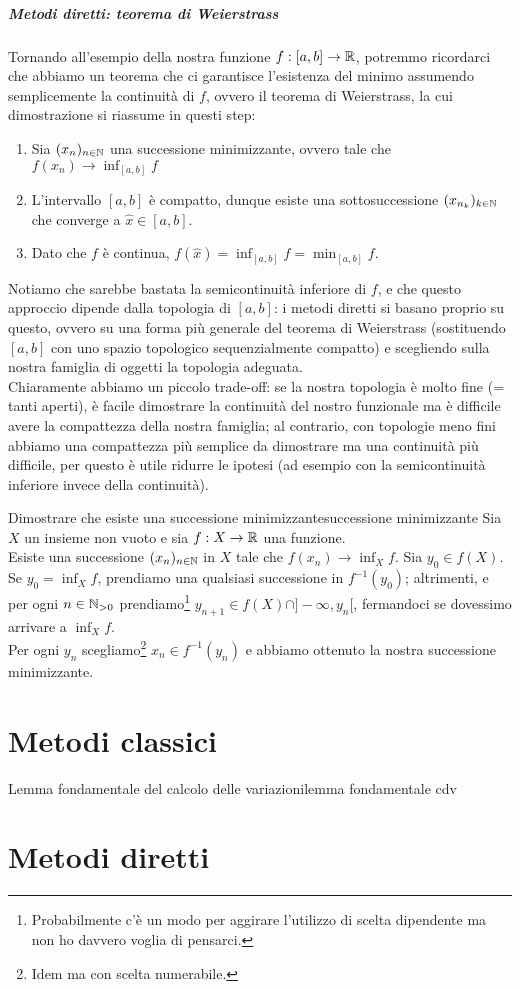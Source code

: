 \documentclass[openany]{book}
\begin{document}
\subsubsection*{Metodi diretti: teorema di Weierstrass}

Tornando all'esempio della nostra funzione $f:[a,b]\to \mathbb{R}$, potremmo ricordarci che abbiamo un teorema che ci garantisce l'esistenza del minimo assumendo semplicemente la continuità di $f$, ovvero il teorema di Weierstrass, la cui dimostrazione si riassume in questi step:\begin{enumerate}
    \item Sia $(x_n)_{n\in\mathbb{N}}$ una successione minimizzante, ovvero tale che $f(x_n)\to \inf_{[a,b]}f$
    \item L'intervallo $[a,b]$ è compatto, dunque esiste una sottosuccessione $(x_{n_k})_{k \in \mathbb{N}}$ che converge a $\hat{x} \in [a,b]$.
    \item Dato che $f$ è continua, $f(\hat{x}) = \inf_{[a,b]}f = \min_{[a,b]}f$.
\end{enumerate}
Notiamo che sarebbe bastata la semicontinuità inferiore di $f$, e che questo approccio dipende dalla topologia di $[a,b]$: i metodi diretti si basano proprio su questo, ovvero su una forma più generale del teorema di Weierstrass (sostituendo $[a,b]$ con uno spazio topologico sequenzialmente compatto) e scegliendo sulla nostra famiglia di oggetti la topologia adeguata.\\
Chiaramente abbiamo un piccolo trade-off: se la nostra topologia è molto fine (= tanti aperti), è facile dimostrare la continuità del nostro funzionale ma è difficile avere la compattezza della nostra famiglia; al contrario, con topologie meno fini abbiamo una compattezza più semplice da dimostrare ma una continuità più difficile, per questo è utile ridurre le ipotesi (ad esempio con la semicontinuità inferiore invece della continuità).

\begin{exercise}{Dimostrare che esiste una successione minimizzante}{successione minimizzante}
    Sia $X$ un insieme non vuoto e sia $f : X\to \mathbb{R}$ una funzione.\\
    Esiste una successione $(x_n)_{n \in \mathbb{N}}$ in $X$ tale che $f(x_n)\to \inf_{X} f$.
    \proof 
    Sia $y_0 \in f(X)$. Se $y_0 = \inf_X f$, prendiamo una qualsiasi successione in $f^{-1}(y_0)$; altrimenti, e per ogni $n \in \mathbb{N}_{>0}$ prendiamo\footnote{Probabilmente c'è un modo per aggirare l'utilizzo di scelta dipendente ma non ho davvero voglia di pensarci.} $y_{n+1} \in f(X) \cap ]-\infty, y_n[$, fermandoci se dovessimo arrivare a $\inf_X f$.\\
    Per ogni $y_n$ scegliamo\footnote{Idem ma con scelta numerabile.} $x_n \in f^{-1}(y_n)$ e abbiamo ottenuto la nostra successione minimizzante.
\end{exercise}

\part{Metodi classici}

\begin{theorem}{Lemma fondamentale del calcolo delle variazioni}{lemma fondamentale cdv}
    
\end{theorem}

\part{Metodi diretti}
\end{document}
